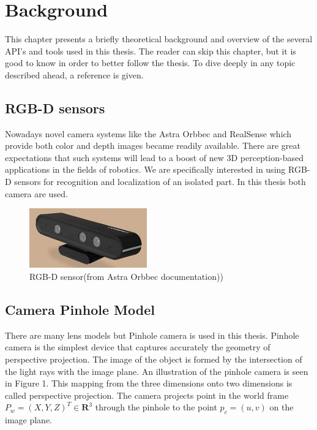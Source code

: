 
\chapter{Background}
\label{chap:back}

This chapter presents a briefly theoretical background and overview of the several API's and tools used in this thesis. The reader can skip this chapter, but it is good to know in order to better follow the thesis. To dive deeply in any topic described ahead, a reference is given.

\section{ RGB-D sensors}
Nowadays novel camera systems like the Astra Orbbec and RealSense which provide both color and depth images became readily available. There are great expectations that such systems will lead to a boost of new 3D perception-based applications in the fields of robotics. We are specifically interested in using RGB-D sensors for recognition and localization of an isolated part. In this thesis both camera are used.

\begin{figure}[!h]
\begin{center}
\includegraphics[width=2in]{figures02/astraorbbec.jpg}
\caption{RGB-D sensor(from Astra Orbbec documentation))}%
\end{center}
\end{figure}

\section{ Camera Pinhole Model}
There are many lens models but Pinhole camera is used in this thesis. Pinhole camera is the simplest device that captures accurately the geometry of perspective projection. The image of the object is formed by the intersection of the light rays with the image plane. An illustration of the pinhole camera is seen in  Figure 1. This mapping from the three dimensions onto two dimensions is called perspective projection. The camera projects point in the world frame $ P_{w}=(X,Y,Z)^{T} \in \textbf{R}^{3}$ through the pinhole to  the point $p_{c}=(u,v)$ on the image plane.
 
